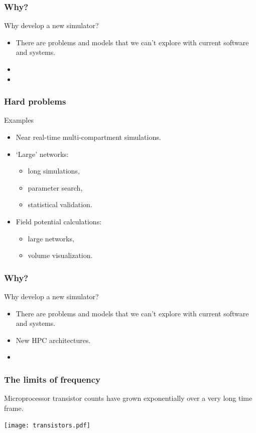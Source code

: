 \documentclass[aspectratio=43,12pt]{beamer}
\newcommand{\subheading}[1]{{\large #1}}
\begin{document}
\begin{frame}
\frametitle{Why?}
\subheading{Why develop a new simulator?}
\vfill
\begin{itemize}
\item
There are problems and models that we can't explore
with current software and systems.
\item[]
{}
\item[]
{}
\end{itemize}
\vfill
\end{frame}

\begin{frame}
\frametitle{Hard problems}
\subheading{Examples}
\vfill
\begin{itemize}
\item
Near real-time multi-compartment simulations.
\item `Large' networks:\
\begin{itemize}
\item long simulations,
\item parameter search,
\item statistical validation.
\end{itemize}
\item Field potential calculations:\\
\begin{itemize}
\item large networks,
\item volume visualization.
\end{itemize}
\end{itemize}
\vfill
\end{frame}

\begin{frame}
\frametitle{Why?}
\subheading{Why develop a new simulator?}
\vfill
\begin{itemize}
\item
\textcolor{light-grey}{%
There are problems and models that we can't explore
with current software and systems.}
\item
New HPC architectures.
\item[]
{}
\end{itemize}
\vfill
\end{frame}

\begin{frame}
\frametitle{The limits of frequency}

\vfill
Microprocessor transistor counts have grown
exponentially over a very long time frame.

\vfill
\texttt{[image: transistors.pdf]}

\vfill
\end{frame}
\end{document}
